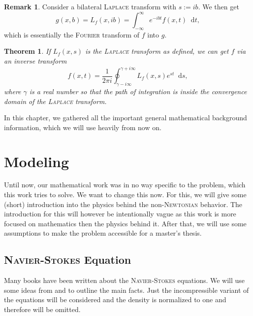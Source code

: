 \documentclass[12pt,a4paper,twoside, open=right]{scrreprt}
\theoremstyle{definition}
\newtheorem{rem}[auf]{Remark}
\theoremstyle{plain}
\newtheorem{sa}[auf]{Theorem}
\newcommand{\D}{\mathop{}\!\mathrm{d}}
\begin{document}
\begin{rem}
    Consider a bilateral \textsc{Laplace} transform with $s:=ib$. We then get
    \begin{equation}
        g(x,b)=L_f(x,ib)=\int_{-\infty}^\infty e^{-ibt}f(x,t)\D t,
    \end{equation}
    which is essentially the \textsc{Fourier} transform of $f$ into $g$.
\end{rem}
\begin{sa}
    If $L_f(x,s) $ is the \textsc{Laplace} transform as defined, we can get $f$ via an inverse transform
    \begin{equation}
        f(x,t) = \frac{1}{2\pi i}\oint_{\gamma-i\infty}^{\gamma +i\infty}L_f(x,s)e^{st}\D s,
    \end{equation}
    where $\gamma$ is a real number so that the path of integration is inside the convergence domain of the \textsc{Laplace} transform.
\end{sa}
In this chapter, we gathered all the important general mathematical background information, which we will use heavily from now on. 
\chapter{Modeling}
Until now, our mathematical work was in no way specific to the problem, which this work tries to solve. We want to change this now. For this, we will give some (short) introduction into the physics behind the non-\textsc{Newtonian} behavior. The introduction for this will however be intentionally vague as this work is more focused on mathematics then the physics behind it. After that, we will use some assumptions to make the problem accessible for a master's thesis.
\section{\textsc{Navier-Stokes} Equation}
Many books have been written about the \textsc{Navier-Stokes} equations. We will use some ideas from \cite{Lukaszewicz2016} and \cite{White2006} to outline the main facts. Just the incompressible variant of the equations will be considered and the density is normalized to one and therefore will be omitted.
\end{document}
